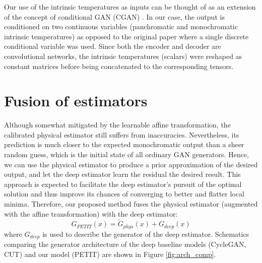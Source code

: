 Our use of the intrinsic temperatures as inputs can be thought of as an extension of the concept of conditional GAN (CGAN) \cite{mirza2014conditional}.
In our case, the output is conditioned on two continuous variables (panchromatic and monochromatic intrinsic temperatures) as opposed to the original paper where a single discrete conditional variable was used.
Since both the encoder and decoder are convolutional networks, the intrinsic temperatures (scalars) were reshaped as constant matrices before being concatenated to the corresponding tensors.

\section{Fusion of estimators} %
Although somewhat mitigated by the learnable affine transformation, the calibrated physical estimator still suffers from inaccuracies.
Nevertheless, its prediction is much closer to the expected monochromatic output than a sheer random guess, which is the initial state of all ordinary GAN generators.
Hence, we can use the physical estimator to produce a prior approximation of the desired output, and let the deep estimator learn the residual \wrt the desired result.
This approach is expected to facilitate the deep estimator's pursuit of the optimal solution and thus improve its chances of converging to better and flatter local minima.
Therefore, our proposed method fuses the physical estimator (augmented with the affine transformation) with the deep estimator:
\begin{equation} \label{eq:genFuse}
  G_{\mathit{PETIT}}(x) = \tilde{G}_\mathit{phys}(x) + G_\mathit{deep}(x)
\end{equation}
where $G_\mathit{deep}$ is used to describe the generator of the deep estimator.
Schematics comparing the generator architecture of the deep baseline models (CycleGAN, CUT) and our model (PETIT) are shown in Figure \ref{fig:arch_comp}.

